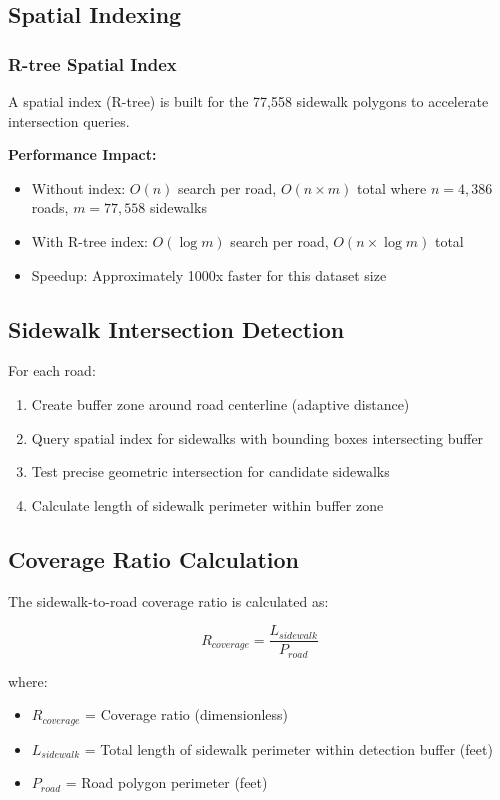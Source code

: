 \documentclass[11pt,letterpaper]{article}
\begin{document}
\subsection{Spatial Indexing}

\subsubsection{R-tree Spatial Index}

A spatial index (R-tree) is built for the 77,558 sidewalk polygons to accelerate intersection queries.

\textbf{Performance Impact:}
\begin{itemize}
    \item Without index: $O(n)$ search per road, $O(n \times m)$ total where $n=4,386$ roads, $m=77,558$ sidewalks
    \item With R-tree index: $O(\log m)$ search per road, $O(n \times \log m)$ total
    \item Speedup: Approximately 1000x faster for this dataset size
\end{itemize}

\subsection{Sidewalk Intersection Detection}

For each road:
\begin{enumerate}
    \item Create buffer zone around road centerline (adaptive distance)
    \item Query spatial index for sidewalks with bounding boxes intersecting buffer
    \item Test precise geometric intersection for candidate sidewalks
    \item Calculate length of sidewalk perimeter within buffer zone
\end{enumerate}

\subsection{Coverage Ratio Calculation}

The sidewalk-to-road coverage ratio is calculated as:

\begin{equation}
R_{coverage} = \frac{L_{sidewalk}}{P_{road}}
\end{equation}

where:
\begin{itemize}
    \item $R_{coverage}$ = Coverage ratio (dimensionless)
    \item $L_{sidewalk}$ = Total length of sidewalk perimeter within detection buffer (feet)
    \item $P_{road}$ = Road polygon perimeter (feet)
\end{itemize}
\end{document}
